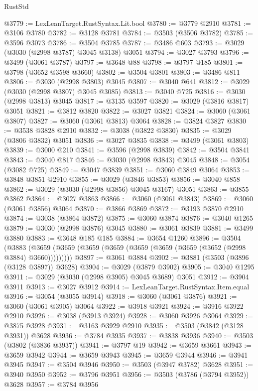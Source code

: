 \begin{lexlean}{RustStd}
\begin{coremodule}
@3779 := LexLeanTarget.RustSyntax.Lit.bool
@3780 := @3779 @2910
@3781 := @3106 @3780
@3782 := @3128 @3781
@3784 := @3503 (@3506 @3782)
@3785 := @3596 @3073
@3786 := @3504 @3785
@3787 := @3486 @603
@3793 := @3029 (@3030 (@2998 @3787) @3045 @3138) @3051
@3794 := @3027 @3793
@3796 := @3499 (@3061 @3787)
@3797 := @3648 @88
@3798 := @3797 @185
@3801 := @3798 (@3652 @3598 @3660)
@3802 := @3504 @3801
@3803 := @3486 @811
@3806 := @3030 (@2998 @3803) @3045
@3807 := @3040 @641
@3812 := @3029 (@3030 (@2998 @3807) @3045 @3085)
@3813 := @3040 @725
@3816 := @3030 (@2998 @3813) @3045
@3817 := @3135 @3597
@3820 := @3029 (@3816 @3817) @3051
@3821 := @3812 @3820
@3822 := @3027 @3821
@3824 := @3060 (@3061 @3807)
@3827 := @3060 (@3061 @3813) @3064
@3828 := @3824 @3827
@3830 := @3538 @3828 @2910
@3832 := @3038 (@3822 @3830)
@3835 := @3029 (@3806 @3832) @3051
@3836 := @3027 @3835
@3838 := @3499 (@3061 @3803)
@3839 := @3000 @210
@3841 := @3596 (@2998 @3839)
@3842 := @3504 @3841
@3843 := @3040 @817
@3846 := @3030 (@2998 @3843) @3045
@3848 := @3054 (@3082 @725)
@3849 := @3047 @3839
@3851 := @3060 @3849 @3064
@3853 := @3848 @3851 @2910
@3855 := @3029 (@3846 @3853)
@3856 := @3040 @858
@3862 := @3029 (@3030 (@2998 @3856) @3045 @3167) @3051
@3863 := @3855 @3862
@3864 := @3027 @3863
@3866 := @3060 (@3061 @3843)
@3869 := @3060 (@3061 @3856) @3064
@3870 := @3866 @3869
@3872 := @3193 @3870 @2910
@3874 := @3038 (@3864 @3872)
@3875 := @3060 @3874
@3876 := @3040 @1265
@3879 := @3030 (@2998 @3876) @3045
@3880 := @3061 @3839
@3881 := @3499 @3880
@3883 := @3648 @185 @185
@3884 := @3654 @1260
@3896 := @3504
    (@3883 (@3659 (@3659 (@3659 (@3659 (@3659 (@3659 (@3659 (@3652 (@2998 @3884) @3660)))))))))
@3897 := @3061 @3884
@3902 := @3881 (@3503 (@3896 (@3128 @3897)) @3628)
@3904 := @3029 (@3879 @3902)
@3905 := @3040 @1295
@3911 := @3029 (@3030 (@2998 @3905) @3045 @3689) @3051
@3912 := @3904 @3911
@3913 := @3027 @3912
@3914 := LexLeanTarget.RustSyntax.Item.equal
@3916 := @3054 (@3055 @3914)
@3918 := @3060 (@3061 @3876)
@3921 := @3060 (@3061 @3905) @3064
@3922 := @3918 @3921
@3924 := @3916 @3922 @2910
@3926 := @3038 (@3913 @3924)
@3928 := @3060 @3926 @3064
@3929 := @3875 @3928
@3931 := @3163 @3929 @2910
@3935 := @3503 (@3842 (@3128 @3931)) @3628
@3936 := @3784 @3935
@3937 := @3838 @3936
@3940 := @3503 (@3802 (@3836 @3937))
@3941 := @3797 @19
@3942 := @3659 @3661
@3943 := @3659 @3942
@3944 := @3659 @3943
@3945 := @3659 @3944
@3946 := @3941 @3945
@3947 := @3504 @3946
@3950 := @3503 (@3947 @3782) @3628
@3951 := @3940 @3950
@3952 := @3796 @3951
@3956 := @3503 (@3786 (@3794 @3952)) @3628
@3957 := @3784 @3956

\end{coremodule}
\end{lexlean}
